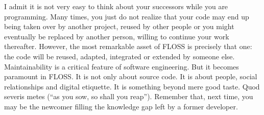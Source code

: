 I admit it is not very easy to think about your successors while you are
programming. Many times, you just do not realize that your code may end up being
taken over by another project, reused by other people or you might eventually be
replaced by another person, willing to continue your work thereafter.
However, the most remarkable asset of FLOSS is precisely that one: the code will
be reused, adapted, integrated or extended by someone else. Maintainability is a
critical feature of software engineering. But it becomes paramount in FLOSS. It
is not only about source code. It is about people, social relationships and
digital etiquette. It is something beyond mere good taste. Quod severis metes
(``as you sow, so shall you reap''). Remember that, next time, you may be the
newcomer filling the knowledge gap left by a former developer.
